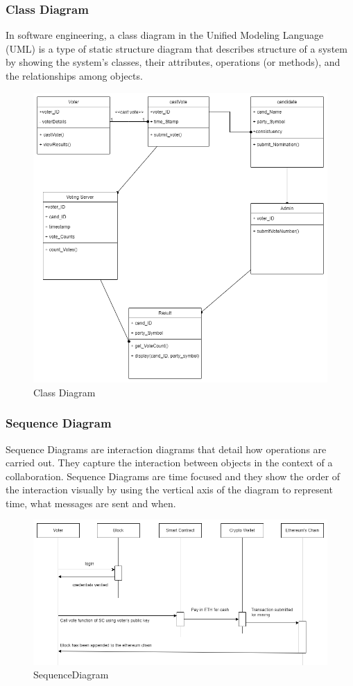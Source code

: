 \documentclass[oneside, 12pt]{book}
\begin{document}
			\subsubsection{Class Diagram}
				In software engineering, a class diagram in the Unified Modeling Language (UML) is a type of static structure diagram that describes structure of a system by showing the system’s classes, their attributes, operations (or methods), and the relationships among objects.
				\begin{figure}[H]
				\centering
				\includegraphics[width=\linewidth]{./Resources/class.png}
			    \caption{Class Diagram}
			    \label{fig:class}
			\end{figure}
			\subsubsection{Sequence Diagram}
				Sequence Diagrams are interaction diagrams that detail how operations are carried out. They capture the interaction between objects in the context of a collaboration. Sequence Diagrams are time focused and they show the order of the interaction visually by using the vertical axis of the diagram to represent time, what messages are sent and when.
				\begin{figure}[H]
					\centering
					\includegraphics[width=\linewidth]{./Resources/sequence.png}
				    \caption{SequenceDiagram}
				    \label{fig:sequence}
				\end{figure}
	\newpage
\end{document}
